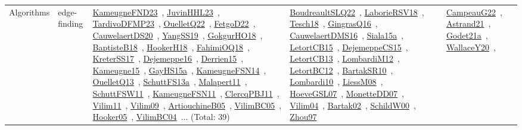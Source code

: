 {\begin{longtable}{lp{3cm}>{\raggedright\arraybackslash}p{6cm}>{\raggedright\arraybackslash}p{6cm}>{\raggedright\arraybackslash}p{8cm}}
Algorithms & edge-finding & \href{works/KameugneFND23.pdf}{KameugneFND23}~\cite{KameugneFND23}, \href{works/JuvinHHL23.pdf}{JuvinHHL23}~\cite{JuvinHHL23}, \href{works/TardivoDFMP23.pdf}{TardivoDFMP23}~\cite{TardivoDFMP23}, \href{works/OuelletQ22.pdf}{OuelletQ22}~\cite{OuelletQ22}, \href{works/FetgoD22.pdf}{FetgoD22}~\cite{FetgoD22}, \href{works/CauwelaertDS20.pdf}{CauwelaertDS20}~\cite{CauwelaertDS20}, \href{works/YangSS19.pdf}{YangSS19}~\cite{YangSS19}, \href{works/GokgurHO18.pdf}{GokgurHO18}~\cite{GokgurHO18}, \href{works/BaptisteB18.pdf}{BaptisteB18}~\cite{BaptisteB18}, \href{works/HookerH18.pdf}{HookerH18}~\cite{HookerH18}, \href{works/FahimiOQ18.pdf}{FahimiOQ18}~\cite{FahimiOQ18}, \href{works/KreterSS17.pdf}{KreterSS17}~\cite{KreterSS17}, \href{works/Dejemeppe16.pdf}{Dejemeppe16}~\cite{Dejemeppe16}, \href{works/Derrien15.pdf}{Derrien15}~\cite{Derrien15}, \href{works/Kameugne15.pdf}{Kameugne15}~\cite{Kameugne15}, \href{works/GayHS15a.pdf}{GayHS15a}~\cite{GayHS15a}, \href{works/KameugneFSN14.pdf}{KameugneFSN14}~\cite{KameugneFSN14}, \href{works/OuelletQ13.pdf}{OuelletQ13}~\cite{OuelletQ13}, \href{works/SchuttFS13a.pdf}{SchuttFS13a}~\cite{SchuttFS13a}, \href{works/Malapert11.pdf}{Malapert11}~\cite{Malapert11}, \href{works/SchuttFSW11.pdf}{SchuttFSW11}~\cite{SchuttFSW11}, \href{works/KameugneFSN11.pdf}{KameugneFSN11}~\cite{KameugneFSN11}, \href{works/ClercqPBJ11.pdf}{ClercqPBJ11}~\cite{ClercqPBJ11}, \href{works/Vilim11.pdf}{Vilim11}~\cite{Vilim11}, \href{works/Vilim09.pdf}{Vilim09}~\cite{Vilim09}, \href{works/ArtiouchineB05.pdf}{ArtiouchineB05}~\cite{ArtiouchineB05}, \href{works/VilimBC05.pdf}{VilimBC05}~\cite{VilimBC05}, \href{works/Hooker05.pdf}{Hooker05}~\cite{Hooker05}, \href{works/VilimBC04.pdf}{VilimBC04}~\cite{VilimBC04}... (Total: 39) & \href{works/BoudreaultSLQ22.pdf}{BoudreaultSLQ22}~\cite{BoudreaultSLQ22}, \href{works/LaborieRSV18.pdf}{LaborieRSV18}~\cite{LaborieRSV18}, \href{works/Tesch18.pdf}{Tesch18}~\cite{Tesch18}, \href{works/GingrasQ16.pdf}{GingrasQ16}~\cite{GingrasQ16}, \href{works/CauwelaertDMS16.pdf}{CauwelaertDMS16}~\cite{CauwelaertDMS16}, \href{works/Siala15a.pdf}{Siala15a}~\cite{Siala15a}, \href{works/LetortCB15.pdf}{LetortCB15}~\cite{LetortCB15}, \href{works/DejemeppeCS15.pdf}{DejemeppeCS15}~\cite{DejemeppeCS15}, \href{works/LetortCB13.pdf}{LetortCB13}~\cite{LetortCB13}, \href{works/LombardiM12.pdf}{LombardiM12}~\cite{LombardiM12}, \href{works/LetortBC12.pdf}{LetortBC12}~\cite{LetortBC12}, \href{works/BartakSR10.pdf}{BartakSR10}~\cite{BartakSR10}, \href{works/Lombardi10.pdf}{Lombardi10}~\cite{Lombardi10}, \href{works/LiessM08.pdf}{LiessM08}~\cite{LiessM08}, \href{works/HoeveGSL07.pdf}{HoeveGSL07}~\cite{HoeveGSL07}, \href{works/MonetteDD07.pdf}{MonetteDD07}~\cite{MonetteDD07}, \href{works/Vilim04.pdf}{Vilim04}~\cite{Vilim04}, \href{works/Bartak02.pdf}{Bartak02}~\cite{Bartak02}, \href{works/SchildW00.pdf}{SchildW00}~\cite{SchildW00}, \href{works/Zhou97.pdf}{Zhou97}~\cite{Zhou97} & \href{works/CampeauG22.pdf}{CampeauG22}~\cite{CampeauG22}, \href{works/Astrand21.pdf}{Astrand21}~\cite{Astrand21}, \href{works/Godet21a.pdf}{Godet21a}~\cite{Godet21a}, \href{works/WallaceY20.pdf}{WallaceY20}~\cite{WallaceY20}, 
\end{longtable}}
